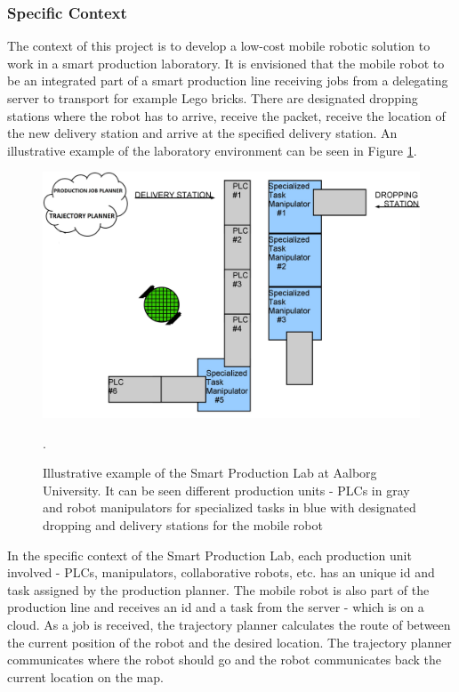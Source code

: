 \subsubsection{Specific Context}

The context of this project is to develop a low-cost mobile robotic solution to work in a smart production laboratory. It is envisioned that the mobile robot to be an integrated part of a smart production line receiving jobs from a delegating server to transport for example Lego bricks. There are designated dropping stations where the robot has to arrive, receive the packet, receive the location of the new delivery station and arrive at the specified delivery station. An illustrative example of the laboratory environment can be seen in Figure \ref{figure:lab}. 

 \begin{figure}[H]
\includegraphics[scale=0.25]{Figures/plc_production line_cloud.jpg}
\centering
\caption{Illustrative example of the Smart Production Lab at Aalborg University. It can be seen different production units - PLCs in gray and robot manipulators for specialized tasks in blue with designated dropping and delivery stations for the mobile robot }.
\label{figure:lab}
\end{figure}

In the specific context of the Smart Production Lab, each production unit involved - PLCs, manipulators, collaborative robots, etc. has an unique id and task assigned by the production planner. The mobile robot is also part of the production line and receives an id and a task from the server - which is on a cloud. As a job is received, the trajectory planner calculates the route of between the current position of the robot and the desired location. The trajectory planner communicates where the robot should go and the robot communicates back the current location on the map.\\

